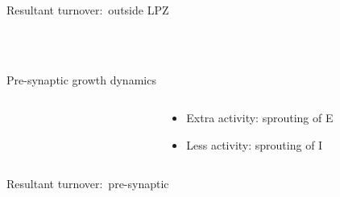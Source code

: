 \begin{frame}[c]{Resultant turnover:\ outside LPZ}
  \begin{figure}[t]
    \centering
    \resizebox{0.6\textwidth}{!}{}\\%
    \resizebox{0.6\textwidth}{!}{}\\%
    \resizebox{0.6\textwidth}{!}{}
  \end{figure}
\end{frame}
\begin{frame}[c]{Pre-synaptic growth dynamics}
  \begin{columns}
    \begin{column}{0.5\textwidth}
      \begin{figure}[h]
        
      \end{figure}
    \end{column}
    \begin{column}{0.6\textwidth}
      \centering
      \begin{itemize}
        \item Extra activity: sprouting of E
        \item Less activity: sprouting of I
      \end{itemize}
    \end{column}
  \end{columns}
\end{frame}
\begin{frame}[c]{Resultant turnover:\ pre-synaptic}
  \begin{figure}[!t]
    \centering
    \resizebox{0.6\textwidth}{!}{}\\%
    \resizebox{0.6\textwidth}{!}{}\\%
    \resizebox{0.6\textwidth}{!}{}
  \end{figure}
\end{frame}


